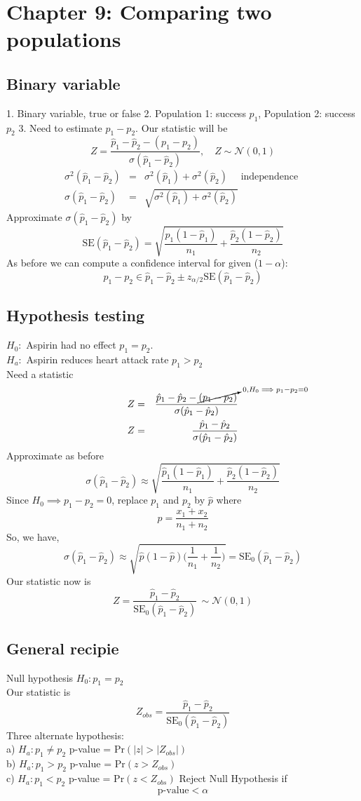 \documentclass{article}
\newcommand{\beq}{\begin{equation}}
\newcommand{\eeq}{\end{equation}}
\newcommand{\ber}{\begin{eqnarray}}
\newcommand{\eer}{\end{eqnarray}}
\begin{document}
\section{Chapter 9: Comparing two populations}
\subsection{Binary variable}
1. Binary variable, true or false
2. Population 1: success $p_1$, Population 2: success $p_2$
3. Need to estimate $p_1-p_2$.
Our statistic will be
\beq
Z = \frac{\hat{p}_1-\hat{p}_2 - (p_1-p_2)}{\sigma(\hat{p}_1-\hat{p}_2)}, \quad Z \sim \mathcal{N}(0,1)
\eeq
\ber
\sigma^2(\hat{p}_1-\hat{p}_2) &=& \sigma^2(\hat{p}_1) + \sigma^2(\hat{p}_2) \quad \text{ independence } \\
\sigma(\hat{p}_1-\hat{p}_2) &=& \sqrt{\sigma^2(\hat{p}_1) + \sigma^2(\hat{p}_2)}
\eer
Approximate $\sigma(\hat{p}_1-\hat{p}_2)$ by
\beq
\text{SE}(\hat{p}_1-\hat{p}_2) = \sqrt{\frac{\hat{p}_1(1-\hat{p}_1)}{n_1} + \frac{\hat{p}_2(1-\hat{p}_2)}{n_2}}
\eeq
As before we can compute a confidence interval for given ($1-\alpha$):
\beq
p_1 - p_2 \in \hat{p}_1-\hat{p}_2 \pm z_{\alpha/2}\text{SE}(\hat{p}_1-\hat{p}_2) 
\eeq
\subsection{Hypothesis testing}
$H_0:$ Aspirin had no effect $p_1=p_2$.\\
$H_a:$ Aspirin reduces heart attack rate $p_1>p_2$\\
Need a statistic
\ber
Z &=& \frac{\hat{p}_1-\hat{p}_2 - \cancelto{0, H_0 \implies p_1-p_2=0}{(p_1-p_2)}}{\sigma(\hat{p}_1-\hat{p}_2)} \\
Z &=& \frac{\hat{p}_1-\hat{p}_2}{\sigma(\hat{p}_1-\hat{p}_2)} 
\eer
Approximate as before
\beq
\sigma(\hat{p}_1-\hat{p}_2) \approx  \sqrt{\frac{\hat{p}_1(1-\hat{p}_1)}{n_1} + \frac{\hat{p}_2(1-\hat{p}_2)}{n_2}}
\eeq
Since $H_0 \implies p_1-p_2=0$, replace $p_1$ and $p_2$ by $\hat{p}$ where
\beq
\hat{p} = \frac{x_1+x_2}{n_1+n_2}
\eeq
So, we have,
\beq
\sigma(\hat{p}_1-\hat{p}_2) \approx \sqrt{\hat{p}(1-\hat{p})\Big(\frac{1}{n_1} + \frac{1}{n_2}\Big)} = \text{SE}_0(\hat{p}_1-\hat{p}_2)    
\eeq
Our statistic now is
\beq
Z = \frac{\hat{p}_1 - \hat{p}_2}{\text{SE}_0(\hat{p}_1-\hat{p}_2)} \, \sim \mathcal{N}(0,1)
\eeq
\subsection{General recipie}
Null hypothesis $H_0: p_1 = p_2$\\
Our statistic is
\beq
Z_{obs} = \frac{\hat{p}_1-\hat{p}_2}{\text{SE}_0(\hat{p}_1-\hat{p}_2)}
\eeq
Three alternate hypothesis:\\
a) $H_a:p_1\ne{}p_2$ p-value = Pr$ (|z|>|Z_{obs}|)$ \\
b) $H_a:p_1>{}p_2$ p-value = Pr$ (z>Z_{obs})$\\
c) $H_a:p_1<{}p_2$ p-value = Pr$ (z<Z_{obs})$
Reject Null Hypothesis if
\beq
\text{p-value} < \alpha
\eeq
\end{document}

